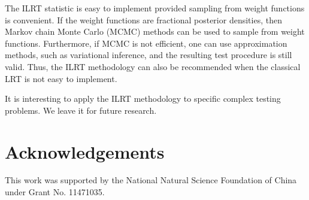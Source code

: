\documentclass[11pt]{article}
\theoremstyle{plain}
\theoremstyle{definition}
\theoremstyle{remark}
\begin{document}
The ILRT statistic is easy to implement provided sampling from weight functions is convenient.
If the weight functions are fractional posterior densities, then Markov chain Monte Carlo (MCMC) methods can be used to sample from weight functions.
Furthermore, if MCMC is not efficient, one can use approximation methods, such as variational inference, and the resulting test procedure is still valid.
Thus, the ILRT methodology can also be recommended when the classical LRT is not easy to implement.

It is interesting to apply the ILRT methodology to specific complex testing problems.
We leave it for future research.

\section*{Acknowledgements}
This work was supported by the National Natural Science Foundation of China under Grant No. 11471035.
\end{document}
